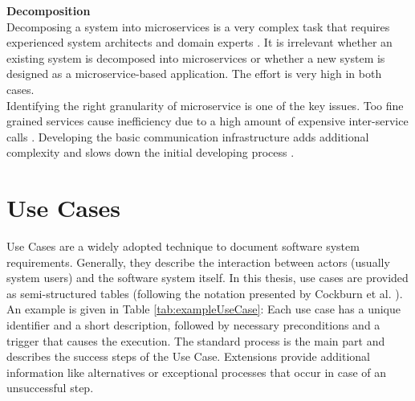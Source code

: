 \noindent
\textbf{Decomposition}\\
Decomposing a system into microservices is a very complex task that requires experienced system architects and domain experts \cite{Fowler}. It is irrelevant whether an existing system is decomposed into microservices or whether a new system is designed as a microservice-based application. The effort is very high in both cases.\\
Identifying the right granularity of microservice is one of the key issues. Too fine grained services cause inefficiency due to a high amount of expensive inter-service calls \cite{DomainEngineeringMunezero}. Developing the basic communication infrastructure adds additional complexity and slows down the initial developing process \cite{infoq}. \\



\section{Use Cases}
\label{sec:PrepApproach:UC}
Use Cases are a widely adopted technique to document software system requirements. Generally, they describe the interaction between actors (usually system users) and the software system itself. In this thesis, use cases are provided as semi-structured tables (following the notation presented by Cockburn et al. \cite{Cockburn}). \\ An example is given in Table \ref{tab:exampleUseCase}: Each use case has a unique identifier and a short description, followed by necessary preconditions and a trigger that causes the execution. The standard process is the main part and describes the success steps of the Use Case. Extensions provide additional information like alternatives or exceptional processes that occur in case of an unsuccessful step. 




